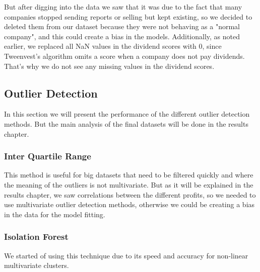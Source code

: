 \documentclass[11pt,english,a4paper,hidelinks]{book}
\begin{document}
\noindent   But after digging into the data we saw that it was due to the fact that many companies stopped sending reports or selling but kept existing, so we decided to deleted them from our dataset because they were not behaving as a "normal company", and this could create a bias in the models. Additionally, as noted earlier, we replaced all NaN values in the dividend scores with 0, since Tweenvest's algorithm omits a score when a company does not pay dividends. That's why we do not see any missing values in the dividend scores.

\subsection{Outlier Detection}


In this section we will present the performance of the different outlier detection methods. But the main analysis of the final datasets will be done in the results chapter.

\subsubsection{Inter Quartile Range}

This method is useful for big datasets that need to be filtered quickly and where the meaning of the outliers is not multivariate. But as it will be explained in the results chapter, we saw correlations between the different profits, so we needed to use multivariate outlier detection methods, otherwise we could be creating a bias in the data for the model fitting.

\subsubsection{Isolation Forest}

We started of using this technique due to its speed and accuracy for non-linear multivariate clusters.
\end{document}
